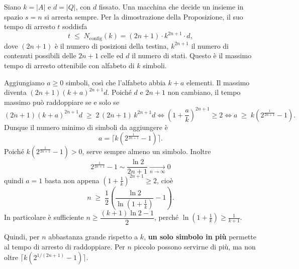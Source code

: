 \begin{sol}
Siano $k=|A|$ e $d=|Q|$, con $d$ fissato. Una macchina che decide un insieme in spazio $s=n$ si arresta sempre. Per la dimostrazione della Proposizione, il suo tempo di arresto $t$ soddisfa
\[
t\;\leq\; N_{\text{config}}(k)=(2n+1)\cdot k^{2n+1}\cdot d ,
\]
dove $(2n+1)$ è il numero di posizioni della testina, $k^{2n+1}$ il numero di contenuti possibili delle $2n+1$ celle ed $d$ il numero di stati. Questo è il massimo tempo di arresto ottenibile con alfabeto di $k$ simboli.

Aggiungiamo $a\geq 0$ simboli, così che l'alfabeto abbia $k+a$ elementi. Il massimo diventa $(2n+1)(k+a)^{2n+1}d$. Poiché $d$ e $2n+1$ non cambiano, il tempo massimo può raddoppiare se e solo se
\[
(2n+1)(k+a)^{2n+1}d\;\geq\;2\,(2n+1)\,k^{2n+1}d
\iff \left(1+\frac{a}{k}\right)^{2n+1}\geq 2
\iff a\;\geq\;k\left(2^{\frac1{2n+1}}-1\right).
\]
Dunque il numero minimo di simboli da aggiungere è
\[
a=\Big\lceil k\left(2^{\frac1{2n+1}}-1\right)\Big\rceil .
\]
Poiché $k\left(2^{\frac1{2n+1}}-1\right)>0$, serve sempre almeno un simbolo. 
Inoltre 
$$2^{\frac1{2n+1}}-1\sim\dfrac{\ln 2}{2n+1}\underset{n\to \infty}{\to} 0$$
quindi $a=1$ basta non appena $\left(1+\frac1k\right)^{2n+1}\geq 2$,
cioè
\[
n\;\geq\;\frac12\left(\frac{\ln 2}{\ln\left(1+\frac1k\right)}-1\right).
\]
In particolare è sufficiente $n\geq \dfrac{(k+1)\ln 2-1}{2}$, perché $\ln\left(1+\frac1k\right)\geq\frac1{k+1}$.

Quindi, per $n$ abbastanza grande rispetto a $k$, \textbf{un solo simbolo in più} permette al tempo di arresto di raddoppiare. Per $n$ piccolo possono servirne di più, ma non oltre $\lceil k(2^{1/(2n+1)}-1)\rceil$.
\end{sol}

